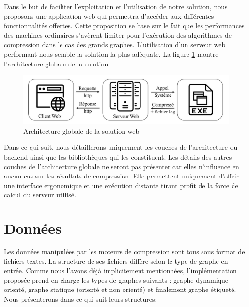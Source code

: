 	Dans le but de faciliter l'exploitation et l'utilisation de notre solution, nous proposons une application web qui permettra  d'accéder aux différentes fonctionnalités offertes. Cette proposition se base sur le fait que les performances des machines ordinaires s'avèrent limiter pour l'exécution des algorithmes de compression dans le cas des grands graphes. L'utilisation d'un serveur web performant nous semble la solution la plus adéquate. La figure \ref{Img:archglob2} montre l'architecture globale de la solution.   	
	
\begin{figure}[H]
	\centering
	\label{Img:archglob2}
	\includegraphics[scale=0.35]{ressources/image/ArchGlob2.jpg}
	\caption{Architecture globale de la solution web}
 \end{figure}
 
 Dans ce qui suit, nous détaillerons uniquement les couches de l'architecture du backend ainsi que les bibliothèques qui les constituent. Les détails des autres couches de l'architecture globale ne seront pas présenter car elles n'influence en aucun cas sur les résultats de compression. Elle permettent uniquement d'offrir une interface ergonomique et une exécution distante tirant profit de la force de calcul du serveur utilisé.
	
	\section{Données}
	Les données manipulées par les moteurs de compression sont tous sous format de fichiers textes. La structure de ses fichiers diffère selon le type de graphe en entrée. Comme nous l'avons déjà implicitement mentionnées, l'implémentation proposée prend en charge les types de graphes suivants : graphe dynamique orienté, graphe statique (orienté et non orienté) et finalement graphe étiqueté. Nous présenterons dans ce qui suit leurs structures:
	
